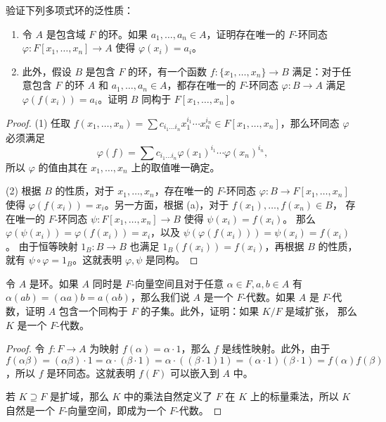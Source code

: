 \begin{problem}
  验证下列多项式环的泛性质：
  \begin{enumerate}
    \item 令 $A$ 是包含域 $F$ 的环。如果 $a_1,\dots,a_n\in A$，证明存在唯一的 $F$-环同态
    $\varphi:F[x_1,\dots,x_n]\to A$ 使得 $\varphi(x_i)=a_i$。
    \item 此外，假设 $B$ 是包含 $F$ 的环，有一个函数 $f:\{x_1,\dots,x_n\}\to B$
    满足：对于任意包含 $F$ 的环 $A$ 和 $a_1,\dots,a_n\in A$，都存在唯一的 $F$-环同态
    $\varphi:B\to A$ 满足 $\varphi(f(x_i))=a_i$。证明 $B$ 同构于 $F[x_1,\dots,x_n]$。
  \end{enumerate}
\end{problem}
\begin{proof}
  (1) 任取 $f(x_1,\dots,x_n)=\sum c_{i_1\dots i_n} x_1^{i_1}\cdots x_n^{i_n}\in F[x_1,\dots,x_n]$，那么环同态 $\varphi$ 必须满足
  \[
    \varphi(f)=\sum c_{i_1\dots i_n}\varphi(x_1)^{i_1}\cdots \varphi(x_n)^{i_n},
  \]
  所以 $\varphi$ 的值由其在 $x_1,\dots,x_n$ 上的取值唯一确定。

  (2) 根据 $B$ 的性质，对于 $x_1,\dots,x_n$，存在唯一的 $F$-环同态 $\varphi:B\to F[x_1,\dots,x_n]$
  使得 $\varphi(f(x_i))=x_i$。另一方面，根据 (a)，对于 $f(x_1),\dots,f(x_n)\in B$，
  存在唯一的 $F$-环同态 $\psi:F[x_1,\dots,x_n]\to B$ 使得 $\psi(x_i)=f(x_i)$。
  那么 $\varphi(\psi(x_i))=\varphi(f(x_i))=x_i$，以及 $\psi(\varphi(f(x_i)))=\psi(x_i)=f(x_i)$。
  由于恒等映射 $1_B:B\to B$ 也满足 $1_B(f(x_i))=f(x_i)$，再根据 $B$ 的性质，
  就有 $\psi\circ\varphi=1_B$。这就表明 $\varphi,\psi$ 是同构。
\end{proof}

\begin{problem}
  令 $A$ 是环。如果 $A$ 同时是 $F$-向量空间且对于任意 $\alpha\in F,a,b\in A$ 有 
  $\alpha(ab)=(\alpha a)b=a(\alpha b)$，那么我们说 $A$ 是一个 $F$-代数。如果 $A$
  是 $F$-代数，证明 $A$ 包含一个同构于 $F$ 的子集。此外，证明：如果 $K/F$ 是域扩张，
  那么 $K$ 是一个 $F$-代数。
\end{problem}
\begin{proof}
  令 $f:F\to A$ 为映射 $f(\alpha)=\alpha\cdot 1$，那么 $f$ 是线性映射。此外，由于
  $f(\alpha\beta)=(\alpha\beta)\cdot 1=\alpha\cdot (\beta\cdot 1)=\alpha\cdot((\beta\cdot 1)1)
  =(\alpha\cdot 1)(\beta\cdot 1)=f(\alpha)f(\beta)$，所以 $f$ 是环同态。这就表明
  $f(F)$ 可以嵌入到 $A$ 中。
  
  若 $K\supseteq F$ 是扩域，那么 $K$ 中的乘法自然定义了 $F$ 在 $K$ 上的标量乘法，所以
  $K$ 自然是一个 $F$-向量空间，即成为一个 $F$-代数。
\end{proof}

